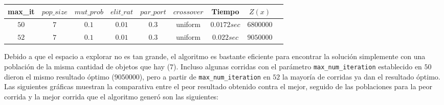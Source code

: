\documentclass[a4paper, 12pt]{article}
\begin{document}
\begin{table}[!ht]
    \begin{adjustbox}{width=\textwidth}
        \begin{tabular}{|c|c|c|c|c|c|c|c|c|}
            \rowcolor{yellow}
            \hline
            max\_it & $pop\_size$ & $mut\_prob$ & $elit\_rat$ & $par\_port$ & $crossover$ & Tiempo      & $Z(x)$    \\
            \hline
            $50$    & $7$         & $0.1$       & $0.01$      & $0.3$       & uniform     & $0.0172sec$ & $6800000$ \\
            \hline
            $52$    & $7$         & $0.1$       & $0.01$      & $0.3$       & uniform     & $0.022sec$  & $9050000$ \\
            \hline
        \end{tabular}
    \end{adjustbox}
\end{table}

Debido a que el espacio a explorar no es tan grande, el algoritmo es bastante eficiente para encontrar la solución simplemente con una población de la misma cantidad de objetos que hay ($7$). Incluso algunas corridas con el parámetro \lstinline{max_num_iteration} establecido en $50$ dieron el mismo resultado óptimo ($9050000$), pero a partir de \lstinline{max_num_iteration} en $52$ la mayoría de corridas ya dan el resultado óptimo. Las siguientes gráficas muestran la comparativa entre el peor resultado obtenido contra el mejor, seguido de las poblaciones para la peor corrida y la mejor corrida que el algoritmo generó son las siguientes:
\end{document}
